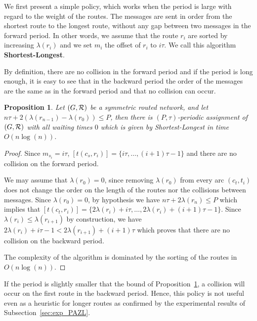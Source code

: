 \documentclass[a4paper,10pt]{article}
\newtheorem{proposition}{Proposition}
\begin{document}
{    We first present a simple policy, which works when the period is large with regard to the weight of the routes.
    The messages are sent in order from the shortest route to the longest route, without any gap between two messages in the forward period.
    In other words, we assume that the route $r_i$ are sorted by increasing $\lambda(r_i)$ and we set $m_{i}$ the offset of $r_i$ to $i\tau$. We call this algorithm {\bf Shortest-Longest}.
      
     By definition, there are no collision in the forward period and if the period is long enough, 
     it is easy to see that in the backward period the order of the messages are the same as in the forward period and that no collision can occur. 
      
      
      \begin{proposition} Let $(G, {\cal R})$ be a symmetric routed network, and let $n\tau + 2(\lambda(r_{n-1}) - \lambda(r_{0})) \leq P$, then there is $(P,\tau)$-periodic assignment of $(G, {\cal R})$ with all waiting times $0$ which is given by Shortest-Longest in time $O(n\log(n))$.\label{prop:SL}
      \end{proposition}
      \begin{proof}
       Since $m_{s_i} = i\tau$, $[t(c_s,r_{i})] = \{i\tau,\dots, (i+1)\tau -1\}$ and there are no collision on the forward period.
       
       
       We may assume that $\lambda(r_{0}) = 0$, since removing $\lambda(r_{0})$ from every arc $(c_t,t_i)$ does not change the order on the length of the routes nor the collisions between messages.
       Since $\lambda(r_{0}) = 0$, by hypothesis we have $n\tau + 2\lambda(r_{n}) \leq P$ which implies that
       $[t(c_t,r_{i})] = \{2 \lambda(r_{i}) + i\tau, \dots,  2 \lambda(r_{i}) + (i+1)\tau -1\}$.
       Since $ \lambda(r_{i}) \leq  \lambda(r_{i+1})$ by construction, we have  $2 \lambda(r_{i}) + i\tau -1 < 2 \lambda(r_{i+1}) + (i+1)\tau$ which proves that there are no collision on the backward period. 
       
       The complexity of the algorithm is dominated by the sorting of the routes in $O(n\log(n))$. 
      \end{proof}

      If the period is slightly smaller that the bound of Proposition~\ref{prop:SL}, a collision will occur on the first route in the backward period. Hence, this policy is not useful even as a heuristic for longer routes as confirmed by the experimental results of Subsection~\ref{sec:exp_PAZL}. 

}
\end{document}

